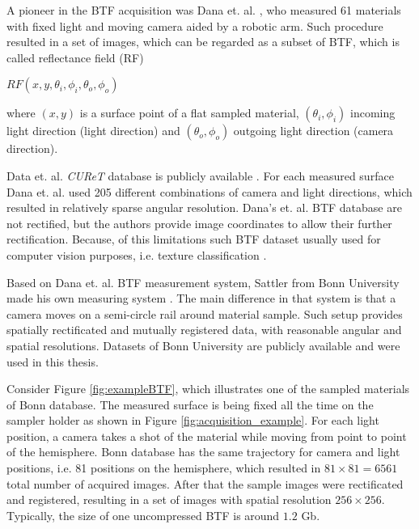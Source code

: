  
A pioneer in the BTF acquisition was Dana et. al. \cite{curetDataBase}, who measured 61 materials with fixed light and moving camera aided by a robotic arm. 
Such procedure resulted in a set of images, which can be regarded as a subset of BTF, which is called reflectance field (RF)

{\centering $RF(x,y,\theta _{i},\phi _{i},\theta _{o},\phi _{o})$ \\}

where $(x,y)$ is a surface point of a flat sampled material, $(\theta _{i},\phi _{i})$ incoming light direction (light direction) and $(\theta _{o},\phi _{o})$ outgoing light direction (camera direction).

Data et. al. \emph{CUReT} database is publicly available \cite{curetDataBase}.
For each measured surface Dana et. al. used 205 different combinations of camera and light directions, which resulted in relatively sparse angular resolution.
 Dana's et. al. BTF database are not rectified, but  the authors provide image coordinates to allow their further rectification. 
 Because, of this limitations such BTF dataset usually used for computer vision purposes, i.e. texture classification  \cite{haindl_visual}.

Based on Dana et. al. BTF measurement system, Sattler from Bonn University made his own measuring system \cite{sattler-2003-efficient}.
 The main difference in that system is that a camera moves on a semi-circle rail around material sample.
Such setup provides spatially rectificated and mutually registered data, with reasonable angular and spatial resolutions. 
Datasets of Bonn University \cite{btfBonn} are publicly available and were used in this thesis.


 Consider Figure \ref{fig:exampleBTF}, which illustrates one of the sampled materials of Bonn database.
The measured surface is being fixed all the time on the sampler holder as shown in Figure \ref{fig:acquisition_example}. For each light position, a camera takes a shot of the material while moving from point to point of the hemisphere.
Bonn database has the same trajectory for camera and light positions, i.e. 81 positions on the hemisphere, which resulted in $81\times81=6561$ total number of acquired images.
After that the sample images were rectificated and registered, resulting in a set of images with spatial resolution $256\times256$.
Typically, the size of one uncompressed BTF is around $1.2$ Gb.






